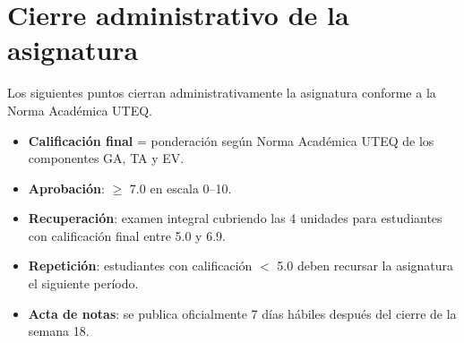 \section{Cierre administrativo de la asignatura}

Los siguientes puntos cierran administrativamente la
asignatura conforme a la Norma Académica UTEQ.


\begin{itemize}
\item \textbf{Calificación final} = ponderación según Norma Académica
UTEQ de los componentes GA, TA y EV.
\item \textbf{Aprobación}: $\geq$ 7.0 en escala 0--10.
\item \textbf{Recuperación}: examen integral cubriendo las 4 unidades
para estudiantes con calificación final entre 5.0 y 6.9.
\item \textbf{Repetición}: estudiantes con calificación $<$ 5.0 deben
recursar la asignatura el siguiente período.
\item \textbf{Acta de notas}: se publica oficialmente 7 días hábiles
después del cierre de la semana 18.
\end{itemize}



